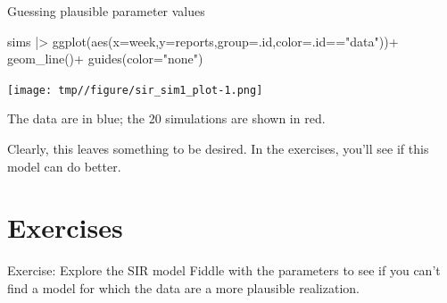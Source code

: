 \documentclass[
  ignorenonframetext,
  aspectratio=169,
  t]{beamer}
\newenvironment{Shaded}{\begin{snugshade}}{\end{snugshade}}
\newcommand{\AttributeTok}[1]{\textcolor[rgb]{0.40,0.45,0.13}{#1}}
\newcommand{\FunctionTok}[1]{\textcolor[rgb]{0.28,0.35,0.67}{#1}}
\newcommand{\NormalTok}[1]{\textcolor[rgb]{0.00,0.23,0.31}{#1}}
\newcommand{\SpecialCharTok}[1]{\textcolor[rgb]{0.37,0.37,0.37}{#1}}
\newcommand{\StringTok}[1]{\textcolor[rgb]{0.13,0.47,0.30}{#1}}
\theoremstyle{definition}
\begin{document}
\begin{frame}{Guessing plausible parameter
values}
\begin{Shaded}
\begin{Highlighting}[]
\NormalTok{    sims }\SpecialCharTok{|\textgreater{}}
      \FunctionTok{ggplot}\NormalTok{(}\FunctionTok{aes}\NormalTok{(}\AttributeTok{x=}\NormalTok{week,}\AttributeTok{y=}\NormalTok{reports,}\AttributeTok{group=}\NormalTok{.id,}\AttributeTok{color=}\NormalTok{.id}\SpecialCharTok{==}\StringTok{"data"}\NormalTok{))}\SpecialCharTok{+}
      \FunctionTok{geom\_line}\NormalTok{()}\SpecialCharTok{+}
      \FunctionTok{guides}\NormalTok{(}\AttributeTok{color=}\StringTok{"none"}\NormalTok{)}
\end{Highlighting}
\end{Shaded}

\begin{center}
\texttt{[image: tmp//figure/sir\_sim1\_plot-1.png]}
\end{center}

The data are in blue; the 20 simulations are shown in red.

Clearly, this leaves something to be desired. In the exercises, you'll
see if this model can do better.
\end{frame}

\section{Exercises}\label{exercises}

\begin{frame}{Exercise: Explore the SIR model}
\label{exercise-explore-the-sir-model}
Fiddle with the parameters to see if you can't find a model for which
the data are a more plausible realization.
\end{frame}
\end{document}
